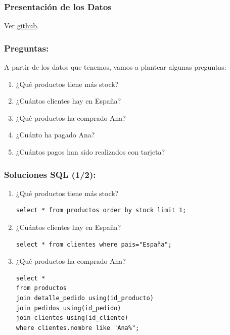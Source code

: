 \documentclass{beamer}
\begin{document}

\begin{frame}  \frametitle{Presentación de los Datos}

	Ver \href{https://github.com/Dpto-Informatica-IES-Francisco-de-Goya/BasesDeDatos/blob/main/dbs/tiendaonline/tienda\_online\_full\_data.md}{github}.
\end{frame}


\begin{frame}[fragile]
  \frametitle{Preguntas:}

  A partir de los datos que tenemos, vamos a plantear algunas preguntas:

  \begin{enumerate}
    \item ¿Qué productos tiene más stock?
    \item ¿Cuántos clientes hay en España?
    \item ¿Qué productos ha comprado Ana?
    \item ¿Cuánto ha pagado Ana?
    \item ¿Cuántos pagos han sido realizados con tarjeta?


  \end{enumerate}
\end{frame}




\begin{frame}[fragile]
  \frametitle{Soluciones SQL (1/2):}

  \begin{enumerate}
    \item ¿Qué productos tiene más stock?
    \begin{lstlisting}
select * from productos order by stock limit 1;
    \end{lstlisting}

    \item ¿Cuántos clientes hay en España?
    \begin{lstlisting}
select * from clientes where pais="España";
    \end{lstlisting}

    \item ¿Qué productos ha comprado Ana?
    \begin{lstlisting}
select *
from productos
join detalle_pedido using(id_producto)
join pedidos using(id_pedido)
join clientes using(id_cliente)
where clientes.nombre like "Ana%";
    \end{lstlisting}
  \end{enumerate}
\end{frame}
\end{document}
